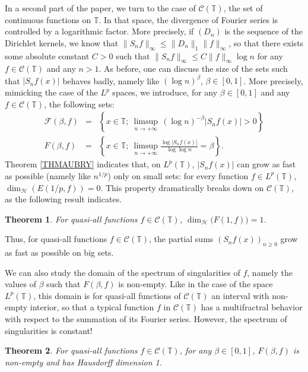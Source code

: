 \documentclass[11pt,a4paper]{amsart}
\theoremstyle{plain}
\newtheorem{theorem}{Theorem}[section]
\begin{document}
In a second part of the paper, we turn to the case of $\mathcal C(\mathbb
T)$, the set of continuous functions on $\mathbb T$. 
In that space, the divergence of Fourier series is controlled by a 
logarithmic factor.
More precisely, if $(D_n)$ is the sequence of the Dirichlet kernels, we know that $\|S_n
f\|_\infty\leq \|D_n\|_1\|f\|_\infty$, so that
there exists some absolute constant $C>0$ such that
$\|S_n f\|_\infty\leq  C\|f\|_\infty\log n$ for any $f\in\mathcal C(\mathbb T)$ and any $n> 1$.
As before, one can discuss the size of the sets such that $|S_nf(x)|$ behaves badly, namely like $(\log n)^{\beta}$,
$\beta\in[0,1]$. More precisely, mimicking the case of the $L^p$ spaces, 
we introduce, for any $\beta\in[0,1]$ and any $f\in\mathcal C(\mathbb T)$, the following sets:
\begin{eqnarray*}
\mathcal F(\beta,f)&=&\left\{x\in\mathbb T;\ \limsup_{n\to+\infty}\,(\log n)^{-\beta}|S_nf(x)|>0\right\}\\
F(\beta,f)&=&\left\{x\in\mathbb T;\ \limsup_{n\to+\infty}\frac{\log |S_nf(x)|}{\log\log n}=\beta\right\}.
\end{eqnarray*}
Theorem \ref{THMAUBRY} indicates that, on $L^p({\mathbb T})$, $|S_nf(x)|$ can grow as fast as possible (namely like $n^{1/p}$) 
only on small sets: for every function $f\in L^p({\mathbb T})$,
$\dim_{\mathcal H}(E(1/p,f))=0$. This property dramatically breaks down on $\mathcal C({\mathbb T})$, as the following result indicates.
\begin{theorem}\label{THMCT1}
For quasi-all functions $f\in\mathcal C({\mathbb T})$, $\dim_{\mathcal H}\big(F(1,f)\big)=1$.
\end{theorem}
Thus, for quasi-all functions $f\in\mathcal C({\mathbb T})$, the partial sums
$(S_nf(x))_{n\ge 0}$ grow as fast as possible on big sets.

We can also study the domain of the spectrum of singularities of $f$, namely the values of $\beta$ such that $F(\beta,f)$ is non-empty.
Like in the case of the space $L^p({\mathbb T})$, this domain is for quasi-all functions of $\mathcal C(\mathbb T)$ an interval with non-empty
interior, so that a typical function $f$ in $\mathcal C(\mathbb T)$ has a multifractral behavior with respect to the summation
of its Fourier series. 
However, the spectrum of singularities is constant!
\begin{theorem}\label{THMCT2}
For quasi-all functions $f\in\mathcal C({\mathbb T})$, for any $\beta\in[0,1]$, $F(\beta,f)$ is non-empty
and has Hausdorff dimension 1.
\end{theorem}
\end{document}
